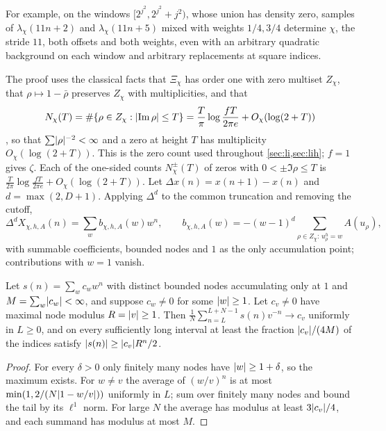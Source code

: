 For example, on the windows $[2^{j^2},2^{j^2}+j^2)$, whose union has density zero, samples of
$\lambda_\chi(11n+2)$ and $\lambda_\chi(11n+5)$ mixed with weights $1/4,3/4$ determine $\chi$, the
stride $11$, both offsets and both weights, even with an arbitrary quadratic background on each
window and arbitrary replacements at square indices.

The proof uses the classical facts that $\Xi_\chi$ has order one with zero multiset $Z_\chi$, that
$\rho\mapsto1-\bar\rho$ preserves $Z_\chi$ with multiplicities, and that
\begin{equation}\label{rec:eq:licount}
 N_\chi(T)=\#\{\rho\in Z_\chi:\lvert\operatorname{Im}\rho\rvert\le T\}=\frac T\pi\log\frac{fT}{2\pi e}+O_\chi(\log(2+T))
\end{equation}
\cite{BennettMartinOBryantRechnitzer2021Counting}, so that $\sum\lvert\rho\rvert^{-2}<\infty$ and a zero at
height $T$ has multiplicity $O_\chi(\log(2+T))$. This is the zero count used throughout
\cref{sec:li,sec:lih}; $f=1$ gives $\zeta$. Each of the one-sided counts $N^\pm_\chi(T)$ of
zeros with $0<\pm\Im\rho\le T$ is $\frac T{2\pi}\log\frac{fT}{2\pi e}+O_\chi(\log(2+T))$. Let $\Delta x(n)=x(n+1)-x(n)$ and $d=\max(2,D+1)$.
Applying $\Delta^d$ to the common truncation and removing the cutoff,
\begin{equation}\label{rec:eq:liexp}
 \Delta^dX_{\chi,h,A}(n)=\sum_wb_{\chi,h,A}(w)w^n,\qquad
 b_{\chi,h,A}(w)=-(w-1)^d\sum_{\rho\in Z_\chi:\,u_\rho^h=w}A(u_\rho),
\end{equation}
with summable coefficients, bounded nodes and $1$ as the only accumulation point; contributions
with $w=1$ vanish.

\begin{lemma}\label{rec:lem:lishell}
Let $s(n)=\sum_wc_ww^n$ with distinct bounded nodes accumulating only at $1$ and
$M=\sum_w\lvert c_w\rvert<\infty$, and suppose $c_w\ne0$ for some $\lvert w\rvert\ge1$. Let $c_v\ne0$ have maximal
node modulus $R=\lvert v\rvert\ge1$. Then $\frac1N\sum_{n=L}^{L+N-1}s(n)v^{-n}\to c_v$ uniformly in $L\ge0$,
and on every sufficiently long interval at least the fraction $\lvert c_v\rvert/(4M)$ of the indices
satisfy $\lvert s(n)\rvert\ge\lvert c_v\rvert R^n/2$.
\end{lemma}

\begin{proof}
For every $\delta>0$ only finitely many nodes have $\lvert w\rvert\ge1+\delta$, so the maximum exists. For
$w\ne v$ the average of $(w/v)^n$ is at most $\min(1,2/(N\lvert1-w/v\rvert))$ uniformly in $L$; sum over
finitely many nodes and bound the tail by its $\ell^1$ norm. For large $N$ the average has modulus
at least $3\lvert c_v\rvert/4$, and each summand has modulus at most $M$.
\end{proof}


